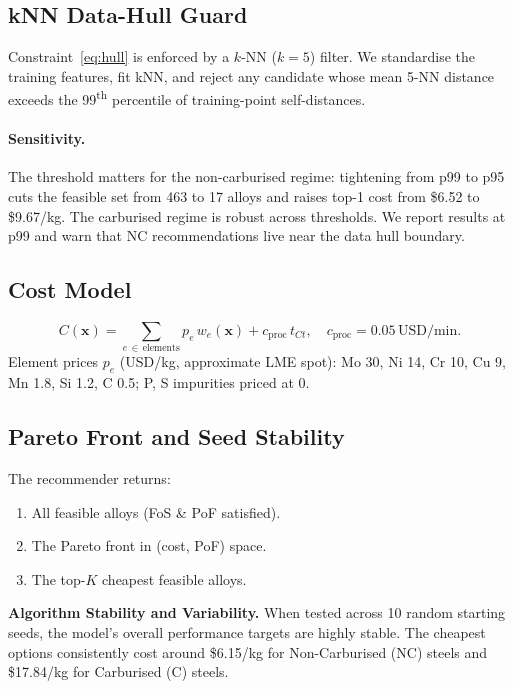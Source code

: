 \documentclass[12pt,a4paper]{article}
\begin{document}
\subsection{kNN Data-Hull Guard}
Constraint~\eqref{eq:hull} is enforced by a $k$-NN ($k=5$) filter. We standardise the
training features, fit kNN, and reject any candidate whose mean 5-NN distance exceeds the
99\textsuperscript{th} percentile of training-point self-distances.

\paragraph{Sensitivity.} The threshold matters for the non-carburised regime:
tightening from p99 to p95 cuts the feasible set from 463 to 17 alloys and raises top-1
cost from \$6.52 to \$9.67/kg. The carburised regime is robust across thresholds. We
report results at p99 and warn that NC recommendations live
near the data hull boundary.

\subsection{Cost Model}\label{sec:cost}
\begin{equation}
  C(\mathbf{x}) = \sum_{e\,\in\,\text{elements}} p_e\,w_e(\mathbf{x})
              + c_{\text{proc}}\,t_{Ct}, \quad c_{\text{proc}} = 0.05\,\text{USD/min}.
\end{equation}
Element prices $p_e$ (USD/kg, approximate LME spot): Mo 30, Ni 14, Cr 10, Cu 9, Mn 1.8,
Si 1.2, C 0.5; P, S impurities priced at 0.

\subsection{Pareto Front and Seed Stability}
The recommender returns:
\begin{enumerate}[nosep]
  \item All feasible alloys (FoS \& PoF satisfied).
  \item The Pareto front in (cost, PoF) space.
  \item The top-$K$ cheapest feasible alloys.
\end{enumerate}

\textbf{Algorithm Stability and Variability.} When tested across 10 random starting seeds,
the model's overall performance targets are highly stable. The cheapest options consistently 
cost around \$6.15/kg for Non-Carburised (NC) steels and \$17.84/kg for Carburised (C) steels.
\end{document}
